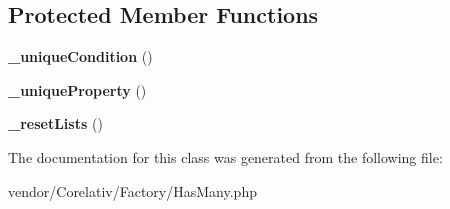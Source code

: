 \subsection*{Protected Member Functions}
\begin{DoxyCompactItemize}
\item 
\hypertarget{classHasMany_ad1c74644a3a9be56634314d4878e95a1}{
{\bfseries \_\-uniqueCondition} ()}
\label{classHasMany_ad1c74644a3a9be56634314d4878e95a1}

\item 
\hypertarget{classHasMany_a1d8610d4b932873e4932ba5f9fb1ca78}{
{\bfseries \_\-uniqueProperty} ()}
\label{classHasMany_a1d8610d4b932873e4932ba5f9fb1ca78}

\item 
\hypertarget{classHasMany_a2c1bd1bbe563d0f02942a826b844f778}{
{\bfseries \_\-resetLists} ()}
\label{classHasMany_a2c1bd1bbe563d0f02942a826b844f778}

\end{DoxyCompactItemize}


The documentation for this class was generated from the following file:\begin{DoxyCompactItemize}
\item 
vendor/Corelativ/Factory/HasMany.php\end{DoxyCompactItemize}
